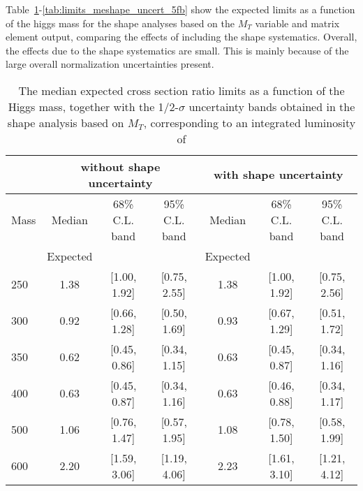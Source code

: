 Table~\ref{tab:limits_mtshape_uncert_5fb}-\ref{tab:limits_meshape_uncert_5fb} show the 
expected limits as a function of the higgs mass for the shape analyses based on 
the $M_T$ variable and matrix element output, comparing the effects of including the 
shape systematics. Overall, the effects due to the shape systematics are small. This 
is mainly because of the large overall normalization uncertainties present. 

\begin{table}[!htbp]
\begin{center}
{\normalsize
\begin{tabular}{|l|c|c|c|c|c|c|}
\hline
      &  \multicolumn{3}{c|}{ without shape uncertainty} &\multicolumn{3}{c|}{ with shape uncertainty} \\
\hline
Mass  &  Median      &     68\% C.L. band &  95\% C.L. band &  Median	   &	 68\% C.L. band &  95\% C.L. band\\
      &  Expected    &                    &                 &  Expected    &			&		 \\
\hline
250 & 1.38 & [1.00, 1.92] & [0.75, 2.55] & 1.38 & [1.00, 1.92] & [0.75, 2.56] \\
300 & 0.92 & [0.66, 1.28] & [0.50, 1.69] & 0.93 & [0.67, 1.29] & [0.51, 1.72] \\
350 & 0.62 & [0.45, 0.86] & [0.34, 1.15] & 0.63 & [0.45, 0.87] & [0.34, 1.16] \\
400 & 0.63 & [0.45, 0.87] & [0.34, 1.16] & 0.63 & [0.46, 0.88] & [0.34, 1.17] \\
500 & 1.06 & [0.76, 1.47] & [0.57, 1.95] & 1.08 & [0.78, 1.50] & [0.58, 1.99] \\
600 & 2.20 & [1.59, 3.06] & [1.19, 4.06] & 2.23 & [1.61, 3.10] & [1.21, 4.12] \\
\hline
\end{tabular}
}
\end{center}
\caption{The median expected cross section ratio limits as a function 
of the Higgs mass, together with the 1/2-$\sigma$ uncertainty bands obtained in the shape analysis based on $M_T$, 
corresponding to an integrated luminosity of \intlumi}
\label{tab:limits_mtshape_uncert_5fb}
\end{table}

